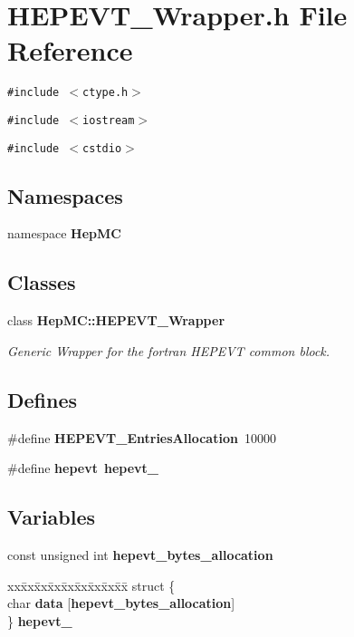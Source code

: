 \section{HEPEVT\_\-Wrapper.h File Reference}
\label{HEPEVT__Wrapper_8h}
{\tt \#include $<$ctype.h$>$}\par
{\tt \#include $<$iostream$>$}\par
{\tt \#include $<$cstdio$>$}\par
\subsection*{Namespaces}
\begin{CompactItemize}
\item 
namespace {\bf Hep\-MC}
\end{CompactItemize}
\subsection*{Classes}
\begin{CompactItemize}
\item 
class {\bf Hep\-MC::HEPEVT\_\-Wrapper}
\begin{CompactList}\small\item\em Generic Wrapper for the fortran HEPEVT common block. \item\end{CompactList}\end{CompactItemize}
\subsection*{Defines}
\begin{CompactItemize}
\item 
\#define {\bf HEPEVT\_\-Entries\-Allocation}~10000
\item 
\#define {\bf hepevt}~{\bf hepevt\_\-}
\end{CompactItemize}
\subsection*{Variables}
\begin{CompactItemize}
\item 
const unsigned int {\bf hepevt\_\-bytes\_\-allocation}
\item 
\begin{tabbing}
xx\=xx\=xx\=xx\=xx\=xx\=xx\=xx\=xx\=\kill
struct \{\\
\>char {\bf data} [{\bf hepevt\_bytes\_allocation}]\\
\} {\bf hepevt\_}\\

\end{tabbing}\end{CompactItemize}


